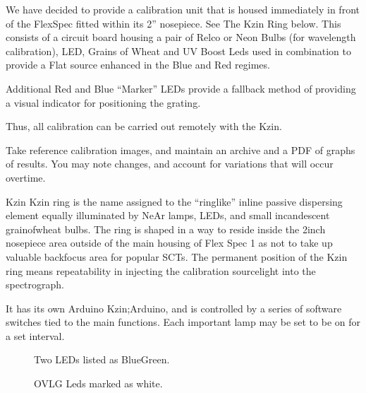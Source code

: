 \documentclass[letterpaper,10pt,english,openany,oneside]{sphinxmanual}
\begin{document}
\sphinxAtStartPar
We have decided to provide a calibration unit that is housed immediately
in front of the FlexSpec fitted within its 2” nosepiece.  See The Kzin
Ring below. This consists of a circuit board housing a pair of Relco or
Neon Bulbs (for wavelength calibration), LED, Grains of Wheat and UV
Boost Leds used in combination to provide a Flat source enhanced in the
Blue and Red regimes.

\sphinxAtStartPar
Additional Red and Blue “Marker” LEDs provide a fallback method of
providing a visual indicator for positioning the grating.

\sphinxAtStartPar
Thus, all calibration can be carried out remotely with the Kzin.

\sphinxAtStartPar
Take reference calibration images, and maintain an archive and a PDF
of graphs of results. You may note changes, and account for
variations that will occur overtime.

\sphinxAtStartPar
Kzin Kzin ring  is the name assigned to the “ring\sphinxhyphen{}like”
in\sphinxhyphen{}line passive dispersing element equally illuminated by NeAr lamps,
LEDs, and small incandescent grain\sphinxhyphen{}of\sphinxhyphen{}wheat bulbs. The ring is shaped
in a way to reside inside the 2\sphinxhyphen{}inch nose\sphinxhyphen{}piece area outside of the
main housing of Flex Spec 1 as not to take up valuable back\sphinxhyphen{}focus area
for popular SCTs. The permanent position of the Kzin ring means
repeatability in injecting the calibration source\sphinxhyphen{}light into the
spectrograph.

\sphinxAtStartPar
It has its own Arduino Kzin;Arduino, and is controlled by a
series of software switches tied to the main functions. Each important
lamp may be set to be on for a set interval.

\begin{figure}[htbp]
\centering
\capstart

\noindent{}
\caption{Two LEDs listed as Blue\sphinxhyphen{}Green.}\label{\detokenize{callamps:id2}}\end{figure}

\begin{figure}[htbp]
\centering
\capstart

\noindent{}
\caption{OVLG Leds marked as white.}\label{\detokenize{callamps:id3}}\end{figure}
\end{document}
